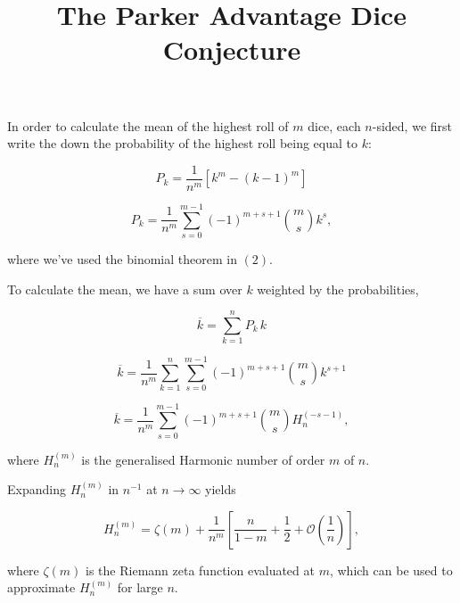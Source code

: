 \documentclass[12pt]{article}
\title{The Parker Advantage Dice Conjecture}
\author{}
\date{}
\begin{document}
\maketitle
\vspace{-0.8em}

In order to calculate the mean of the highest roll of $m$ dice, each $n$-sided, we first write the down the probability of the highest roll being equal to $k$:

\begin{equation}
    P_k
    = \frac{1}{n^m} \left[k^m - {\left(k - 1\right)}^m\right]
\end{equation}

\begin{equation}
    P_k
    = \frac{1}{n^m} \sum_{s=0}^{m-1} {\left(-1\right)}^{m+s+1} \binom{m}{s} k^s,
\end{equation}

where we've used the binomial theorem in $(2)$.
\newline

To calculate the mean, we have a sum over $k$ weighted by the probabilities,

\begin{equation}
    \overline{k}
    = \sum_{k=1}^n P_k \, k
\end{equation}

\begin{equation}
    \overline{k}
    = \frac{1}{n^m} \sum_{k=1}^n \sum_{s=0}^{m-1} {\left(-1\right)}^{m+s+1} \binom{m}{s} k^{s+1}
\end{equation}

\begin{equation}
    \overline{k}
    = \frac{1}{n^m} \sum_{s=0}^{m-1} {\left(-1\right)}^{m+s+1} \binom{m}{s} H_n^{\left(-s-1\right)},
\end{equation}

where $H_n^{\left(m\right)}$ is the generalised Harmonic number of order $m$ of $n$.
\newline

Expanding $H_n^{\left(m\right)}$ in $n^{-1}$ at $n \to \infty$ yields

\begin{equation}
    H_n^{\left(m\right)}
    = \zeta \left(m\right) + \frac{1}{n^m} \left[\frac{n}{1-m} + \frac{1}{2} + \mathcal{O} \left(\frac{1}{n}\right)\right],
\end{equation}

where $\zeta \left(m\right)$ is the Riemann zeta function evaluated at $m$, which can be used to approximate $H_n^{\left(m\right)}$ for large $n$.
\newline
\end{document}
